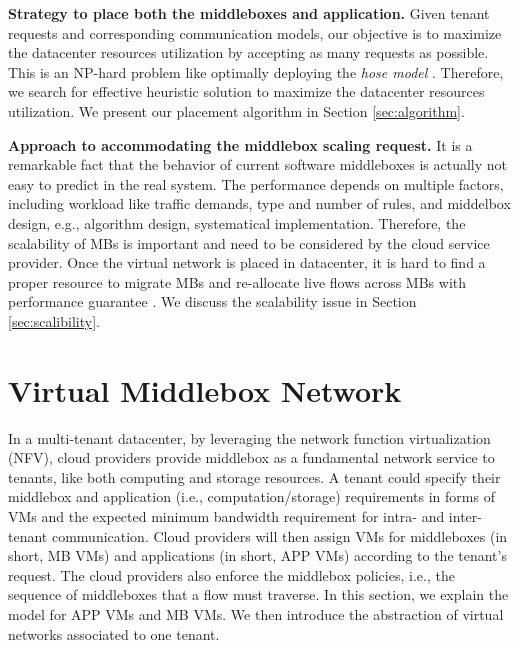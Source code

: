 \documentclass[review]{elsarticle}
\begin{document}
\textbf{Strategy to place both the middleboxes and application.}
Given tenant requests and corresponding communication models, our objective is to maximize the datacenter resources utilization by accepting as many requests as possible. This is an NP-hard problem like optimally deploying the \emph{hose model} \cite{hose_model, cloudmirror}. Therefore, we search for effective heuristic solution to maximize the datacenter resources utilization. We present our placement algorithm in Section \ref{sec:algorithm}. 

\textbf{Approach to accommodating the middlebox scaling request.}
It is a remarkable fact that %
the behavior of current software middleboxes is actually not easy to predict in the real system. 
The performance depends on multiple factors, including workload like traffic demands, type and number of rules, and middelbox design, e.g., algorithm design, systematical implementation. 
Therefore, %
the scalability of MBs is important and need to be considered by the cloud service provider. Once the virtual network is placed in datacenter, it is hard to find a proper resource to migrate MBs and re-allocate live flows across MBs with performance guarantee \cite{G13dio}. We discuss the scalability issue in Section \ref{sec:scalibility}.


\section{Virtual Middlebox Network}\label{sec:abstraction}
In a multi-tenant datacenter, by leveraging the network function virtualization (NFV), cloud providers provide middlebox as a fundamental network service to tenants, like both computing and storage resources. A tenant could specify their middlebox and application (i.e., computation/storage) requirements in forms of VMs and the expected minimum bandwidth requirement for intra- and inter-tenant communication. Cloud providers will then assign VMs for middleboxes (in short, MB VMs) and applications (in short, APP VMs) according to the tenant's request. The cloud providers also enforce the middlebox policies, i.e., the sequence of middleboxes that a flow must traverse. In this section, we explain the model for APP VMs and MB VMs. We then introduce the abstraction of virtual networks associated to one tenant.
\end{document}
